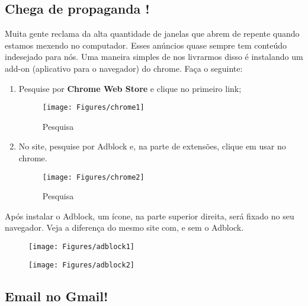 \documentclass[hidelinks,12pt]{article}
\begin{document}
\subsection{Chega de propaganda !}

Muita gente reclama da alta quantidade de janelas que abrem de repente quando estamos mexendo no computador. Esses anúncios quase sempre tem conteúdo indesejado para nós. Uma maneira simples de nos livrarmos disso é instalando um add-on (aplicativo para o navegador) do chrome. Faça o seguinte:

\begin{enumerate}
	\item Pesquise por \textbf{Chrome Web Store} e clique no primeiro link;

	\begin{figure}[!h]
		\centering
		\texttt{[image: Figures/chrome1]}
		\label{fig:chrome1}
		\caption{Pesquisa}
	\end{figure}

	\item No site, pesquise por Adblock e, na parte de extensões, clique em usar no chrome.

	\begin{figure}[!h]
		\centering
		\texttt{[image: Figures/chrome2]}
		\label{fig:chrome2}
		\caption{Pesquisa}
	\end{figure}

\end{enumerate}

Após instalar o Adblock, um ícone, na parte superior direita, será fixado no seu navegador. Veja a diferença do mesmo site com, e sem o Adblock.

\begin{figure}[!htbp]
	\centering
	\begin{minipage}[b]{0.5\textwidth}
		\texttt{[image: Figures/adblock1]}\\

	\end{minipage}
	\hfill
	\begin{minipage}[b]{0.5\textwidth}
		\texttt{[image: Figures/adblock2]}

	\end{minipage}
\end{figure}


\subsection{Email no Gmail!}
\end{document}
